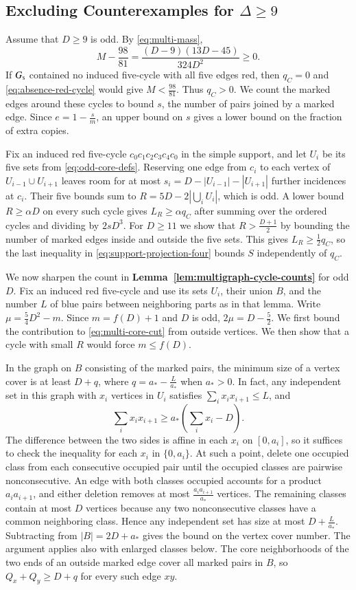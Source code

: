 \documentclass[preprint,11pt,numbers]{elsarticle-arxiv}
\numberwithin{equation}{section}
\theoremstyle{definition}
\begin{document}
\subsection{Excluding Counterexamples for \texorpdfstring{$\Delta\geq9$}{Delta >= 9}}\label{subsec:exact-large-degree}

Assume that $D\geq9$ is odd. By \eqref{eq:multi-mass},
\[
 M-\frac{98}{81}=\frac{(D-9)(13D-45)}{324D^2}\geq0.
\]
If $G_{\rm s}$ contained no induced five-cycle with all five edges red,
then $q_C=0$ and \eqref{eq:absence-red-cycle} would give $M<\frac{98}{81}$.
Thus $q_C>0$. We count the marked edges around these cycles to bound
$s$, the number of pairs joined by a marked edge. Since $e=1-\frac{s}{m}$,
an upper bound on $s$ gives a lower bound on the fraction of extra copies.

Fix an induced red five-cycle $c_0c_1c_2c_3c_4c_0$ in the simple
support, and let $U_i$ be its five sets from \eqref{eq:odd-core-defs}.
Reserving one edge from $c_i$ to each vertex
of $U_{i-1}\cup U_{i+1}$ leaves room for at most
$s_i=D-|U_{i-1}|-|U_{i+1}|$ further incidences at $c_i$. Their five
bounds sum to $R=5D-2|\bigcup_i U_i|$, which is odd. A lower bound
$R\geq\alpha D$ on every such cycle
gives $L_R\geq\alpha q_C$ after summing over the ordered cycles and
dividing by $2sD^3$. For $D\geq11$ we show that $R>\frac{D+1}{2}$
by bounding the number of marked edges inside and outside the five
sets. This gives $L_R\geq\frac12 q_C$, so the last inequality in
\eqref{eq:support-projection-four} bounds $S$ independently of $q_C$.

We now sharpen the count in \textbf{Lemma~\ref{lem:multigraph-cycle-counts}}
for odd $D$. Fix an induced red five-cycle and use its sets $U_i$,
their union $B$, and the number $L$ of blue pairs between neighboring
parts as in that lemma. Write $\mu=\frac{5}{4}D^2-m$. Since $m=f(D)+1$ and $D$ is odd,
$2\mu=D-\frac{5}{2}$. We first bound the contribution to
\eqref{eq:multi-core-cut} from outside vertices. We then show that a cycle
with small $R$ would force $m\le f(D)$.

In the graph on $B$ consisting of the marked pairs, the minimum size
of a vertex cover is at least $D+q$, where $q=a_*-\frac{L}{a_*}$
when $a_*>0$. In fact, any independent set in this graph with $x_i$
vertices in $U_i$ satisfies $\sum_i x_i x_{i+1}\le L$, and
\[
 \sum_i x_i x_{i+1}\ge a_*\left(\sum_i x_i-D\right).
\]
The difference between the two sides is affine in each $x_i$ on
$[0,a_i]$, so it suffices to check the inequality for each $x_i$ in
$\{0,a_i\}$. At such a point, delete one occupied class from each
consecutive occupied pair until the occupied classes are pairwise
nonconsecutive. An edge with both classes occupied accounts for a
product $a_i a_{i+1}$, and either deletion removes at most
$\frac{a_i a_{i+1}}{a_*}$ vertices. The remaining classes contain at
most $D$ vertices because any two nonconsecutive classes have a
common neighboring class. Hence any independent set has size at most
$D+\frac{L}{a_*}$. Subtracting from $|B|=2D+a_*$ gives the bound on
the vertex cover number. The argument applies also with enlarged
classes below. The core neighborhoods of the two ends of an outside
marked edge cover all marked pairs in $B$, so $Q_x+Q_y\ge D+q$ for
every such edge $xy$.
\end{document}
